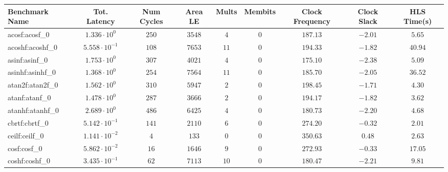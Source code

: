 \begin{tabular}{|l|c|c|c|c|c|c|c|c|}
\hline
Benchmark Name               & Tot. Latency            & Num Cycles & Area LE    & Mults   & Membits & Clock Frequency & Clock Slack & HLS Time(s) \\
\hline
acosf:acosf\_0               & $ 1.336 \cdot 10^{0}  $ & $ 250    $ & $ 3548   $ & $ 4   $ & $ 0   $ & $ 187.13      $ & $ -2.01   $ & $ 5.65    $ \\
acoshf:acoshf\_0             & $ 5.558 \cdot 10^{-1} $ & $ 108    $ & $ 7653   $ & $ 11  $ & $ 0   $ & $ 194.33      $ & $ -1.82   $ & $ 40.94   $ \\
asinf:asinf\_0               & $ 1.753 \cdot 10^{0}  $ & $ 307    $ & $ 4021   $ & $ 4   $ & $ 0   $ & $ 175.10      $ & $ -2.38   $ & $ 5.09    $ \\
asinhf:asinhf\_0             & $ 1.368 \cdot 10^{0}  $ & $ 254    $ & $ 7564   $ & $ 11  $ & $ 0   $ & $ 185.70      $ & $ -2.05   $ & $ 36.52   $ \\
atan2f:atan2f\_0             & $ 1.562 \cdot 10^{0}  $ & $ 310    $ & $ 5947   $ & $ 2   $ & $ 0   $ & $ 198.45      $ & $ -1.71   $ & $ 4.30    $ \\
atanf:atanf\_0               & $ 1.478 \cdot 10^{0}  $ & $ 287    $ & $ 3666   $ & $ 2   $ & $ 0   $ & $ 194.17      $ & $ -1.82   $ & $ 3.62    $ \\
atanhf:atanhf\_0             & $ 2.689 \cdot 10^{0}  $ & $ 486    $ & $ 6425   $ & $ 4   $ & $ 0   $ & $ 180.73      $ & $ -2.20   $ & $ 4.68    $ \\
cbrtf:cbrtf\_0               & $ 5.142 \cdot 10^{-1} $ & $ 141    $ & $ 2110   $ & $ 6   $ & $ 0   $ & $ 274.20      $ & $ -0.32   $ & $ 2.01    $ \\
ceilf:ceilf\_0               & $ 1.141 \cdot 10^{-2} $ & $ 4      $ & $ 133    $ & $ 0   $ & $ 0   $ & $ 350.63      $ & $ 0.48    $ & $ 2.63    $ \\
cosf:cosf\_0                 & $ 5.862 \cdot 10^{-2} $ & $ 16     $ & $ 1646   $ & $ 9   $ & $ 0   $ & $ 272.93      $ & $ -0.33   $ & $ 17.05   $ \\
coshf:coshf\_0               & $ 3.435 \cdot 10^{-1} $ & $ 62     $ & $ 7113   $ & $ 10  $ & $ 0   $ & $ 180.47      $ & $ -2.21   $ & $ 9.81    $ \\

\end{tabular}
